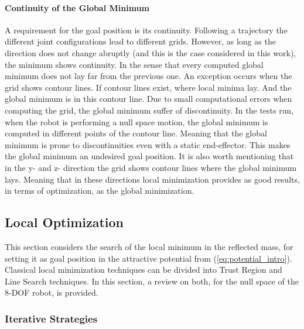 \paragraph{Continuity of the Global Minimum}

A requirement for the goal position is its continuity. Following a trajectory the different joint configurations lead to different grids. However, as long as the direction does not change abruptly (and this is the case considered in this work), the minimum shows continuity. In the sense that every computed global minimum does not lay far from the previous one. An exception occurs when the grid shows contour lines. If contour lines exist, where local minima lay. And the global minimum is in this contour line. Due to small computational errors when computing the grid, the global minimum suffer of discontinuity. In the tests run, when the robot is performing a null space motion, the global minimum is computed in different points of the contour line. Meaning that the global minimum is prone to discontinuities even with a static end-effector. This makes the global minimum an undesired goal position.
It is also worth mentioning that in the y- and z- direction the grid shows contour lines where the global minimum lays. Meaning that in these directions local minimization provides as good results, in terms of optimization, as the global minimization. 




















\subsection{Local Optimization}
\label{ch:localoptimization}
\label{sec:localoptimization}


This section considers the search of the 
local minimum in the reflected mass, for setting it as goal position in the attractive potential from (\ref{eq:potential_intro}). Classical local minimization techniques can be divided  into Trust Region and Line Search   techniques. In this section, a review on both, for the null space of the 8-DOF robot, is provided.



\subsubsection{Iterative Strategies}
\label{sec:iterative_strategies}


